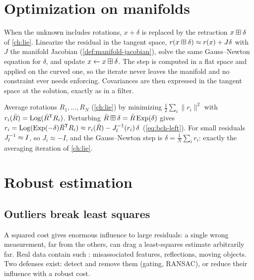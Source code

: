 \section{Optimization on manifolds}
\label{sec:manifold-opt}

When the unknown includes rotations, $x + \delta$ is replaced by the retraction $x\boxplus\delta$ of \cref{ch:lie}. Linearize the residual in the tangent space,
$r(x\boxplus\delta) \approx r(x) + J\delta$ with $J$ the manifold Jacobian (\cref{def:manifold-jacobian}), solve the same Gauss--Newton equation for $\delta$, and
update $x \gets x\boxplus\delta$. The step is computed in a flat space and applied on the curved one, so the iterate never leaves the manifold and no
constraint ever needs enforcing. Covariances are then expressed in the tangent space at the solution, exactly as in a filter.

\begin{example}
Average rotations $R_1, \dots, R_N$ (\cref{ch:lie}) by minimizing $\tfrac12\sum_i\|r_i\|^2$ with $r_i(\bar R) = \operatorname{Log}(\bar R^{\mathsf{T}} R_i)$. Perturbing
$\bar R\boxplus\delta = \bar R\operatorname{Exp}(\delta)$ gives $r_i = \operatorname{Log}(\operatorname{Exp}(-\delta)\bar R^{\mathsf{T}} R_i) \approx r_i(\bar R) - J_l^{-1}(r_i)\,\delta$ (\cref{eq:bch-left}). For small residuals
$J_l^{-1} \approx I$, so $J_i \approx -I$, and the Gauss--Newton step is $\delta = \frac1N\sum_ir_i$: exactly the averaging iteration of \cref{ch:lie}.
\end{example}

\section{Robust estimation}
\label{sec:robust}

\subsection{Outliers break least squares}

A squared cost gives enormous influence to large residuals: a single wrong measurement, far from the others, can drag a least-squares estimate
arbitrarily far. Real data contain such : misassociated features, reflections, moving objects. Two defenses exist: detect and
remove them (gating, RANSAC), or reduce their influence with a robust cost.

